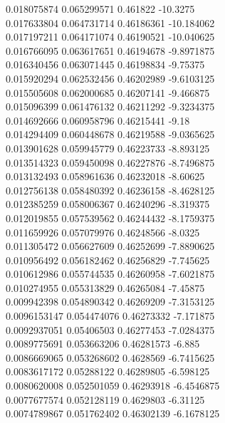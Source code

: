 {0.018075874 0.065299571 0.461822 -10.3275\\
0.017633804 0.064731714 0.46186361 -10.184062\\
0.017197211 0.064171074 0.46190521 -10.040625\\
0.016766095 0.063617651 0.46194678 -9.8971875\\
0.016340456 0.063071445 0.46198834 -9.75375\\
0.015920294 0.062532456 0.46202989 -9.6103125\\
0.015505608 0.062000685 0.46207141 -9.466875\\
0.015096399 0.061476132 0.46211292 -9.3234375\\
0.014692666 0.060958796 0.46215441 -9.18\\
0.014294409 0.060448678 0.46219588 -9.0365625\\
0.013901628 0.059945779 0.46223733 -8.893125\\
0.013514323 0.059450098 0.46227876 -8.7496875\\
0.013132493 0.058961636 0.46232018 -8.60625\\
0.012756138 0.058480392 0.46236158 -8.4628125\\
0.012385259 0.058006367 0.46240296 -8.319375\\
0.012019855 0.057539562 0.46244432 -8.1759375\\
0.011659926 0.057079976 0.46248566 -8.0325\\
0.011305472 0.056627609 0.46252699 -7.8890625\\
0.010956492 0.056182462 0.46256829 -7.745625\\
0.010612986 0.055744535 0.46260958 -7.6021875\\
0.010274955 0.055313829 0.46265084 -7.45875\\
0.009942398 0.054890342 0.46269209 -7.3153125\\
0.0096153147 0.054474076 0.46273332 -7.171875\\
0.0092937051 0.05406503 0.46277453 -7.0284375\\
0.0089775691 0.053663206 0.46281573 -6.885\\
0.0086669065 0.053268602 0.4628569 -6.7415625\\
0.0083617172 0.05288122 0.46289805 -6.598125\\
0.0080620008 0.052501059 0.46293918 -6.4546875\\
0.0077677574 0.052128119 0.4629803 -6.31125\\
0.0074789867 0.051762402 0.46302139 -6.1678125\\
}
